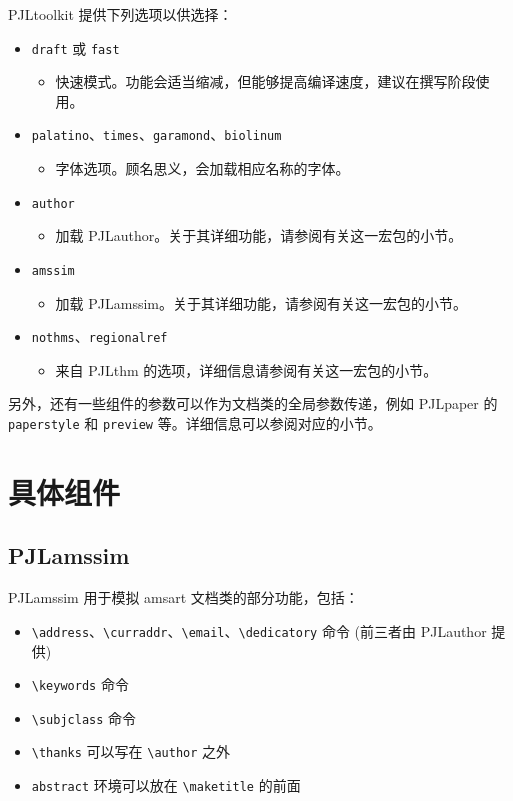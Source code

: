 \documentclass[allowbf,regionalref]{lebhart}
\providecommand{\PJLtoolkit}{\textsf{PJLtoolkit}}
\providecommand{\PJLamssim}{\textsf{PJLamssim}}
\providecommand{\PJLauthor}{\textsf{PJLauthor}}
\providecommand{\PJLpaper}{\textsf{PJLpaper}}
\providecommand{\PJLthm}{\textsf{PJLthm}}
\begin{document}
\PJLtoolkit{} 提供下列选项以供选择：
\begin{itemize}
    \item \texttt{draft} 或 \texttt{fast}
        \begin{itemize}
            \item 快速模式。功能会适当缩减，但能够提高编译速度，建议在撰写阶段使用。
        \end{itemize}
    \item \texttt{palatino}、\texttt{times}、\texttt{garamond}、\texttt{biolinum}
        \begin{itemize}
            \item 字体选项。顾名思义，会加载相应名称的字体。
        \end{itemize}
    \item \texttt{author}
        \begin{itemize}
            \item 加载 \PJLauthor{}。关于其详细功能，请参阅有关这一宏包的小节。
        \end{itemize}
    \item \texttt{amssim}
        \begin{itemize}
            \item 加载 \PJLamssim{}。关于其详细功能，请参阅有关这一宏包的小节。
        \end{itemize}
    \item \texttt{nothms}、\texttt{regionalref}
        \begin{itemize}
            \item 来自 \PJLthm{} 的选项，详细信息请参阅有关这一宏包的小节。
        \end{itemize}
\end{itemize}
另外，还有一些组件的参数可以作为文档类的全局参数传递，例如 \PJLpaper{} 的 \texttt{paperstyle} 和 \texttt{preview} 等。详细信息可以参阅对应的小节。

\section{具体组件}

\subsection{PJLamssim}

\PJLamssim{} 用于模拟 \textsf{amsart} 文档类的部分功能，包括：
\begin{itemize}
    \item \lstinline|\address|、\lstinline|\curraddr|、\lstinline|\email|、\lstinline|\dedicatory| 命令 (前三者由 \PJLauthor{} 提供)
    \item \lstinline|\keywords| 命令
    \item \lstinline|\subjclass| 命令
    \item \lstinline|\thanks| 可以写在 \lstinline|\author| 之外
    \item \lstinline|abstract| 环境可以放在 \lstinline|\maketitle| 的前面
\end{itemize}
\end{document}
